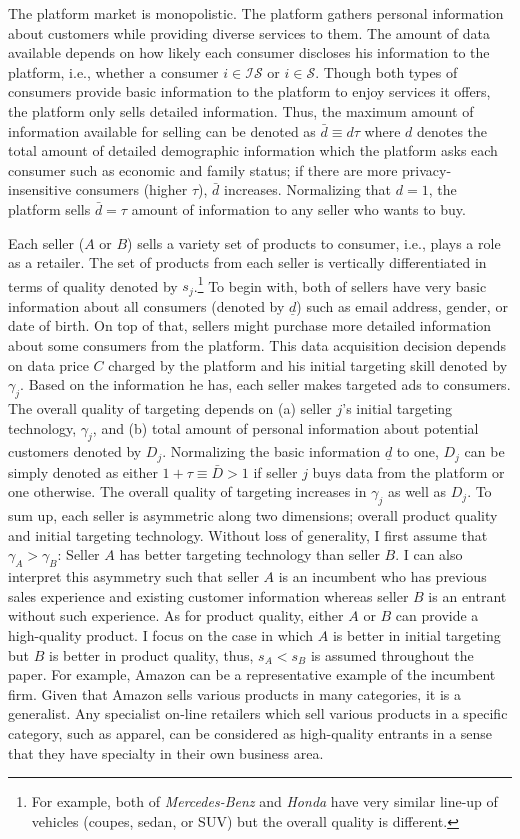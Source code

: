\documentclass[12pt]{article}
\begin{document}
The platform market is monopolistic. The platform gathers personal information about customers while providing diverse services to them. The amount of data available depends on how likely each consumer discloses his information to the platform, i.e., whether a consumer $i \in \mathcal{IS}$ or $i \in \mathcal{S}$. Though both types of consumers provide basic information to the platform to enjoy services it offers, the platform only sells detailed information. Thus, the maximum amount of information available for selling can be denoted as $\bar{d}\equiv d\tau$ where $d$ denotes the total amount of detailed demographic information which the platform asks each consumer such as economic and family status; if there are more privacy-insensitive consumers (higher $\tau$), $\bar{d}$ increases. Normalizing that $d=1$, the platform sells $\bar{d}=\tau$ amount of information to any seller who wants to buy. 

Each seller ($A$ or $B$) sells a variety set of products to consumer, i.e., plays a role as a retailer. The set of products from each seller is vertically differentiated in terms of quality denoted by $s_j$.\footnote{For example, both of \textit{Mercedes-Benz} and \textit{Honda} have very similar line-up of vehicles (coupes, sedan, or SUV) but the overall quality is different.} To begin with, both of sellers have very basic information about all consumers (denoted by $\underline{d}$) such as email address, gender, or date of birth. On top of that, sellers might purchase more detailed information about some consumers from the platform. This data acquisition decision depends on data price $C$ charged by the platform and his initial targeting skill denoted by $\gamma_j$. Based on the information he has, each seller makes targeted ads to consumers. The overall quality of targeting depends on (a) seller $j$'s initial targeting technology, $\gamma_j$, and (b) total amount of personal information about potential customers denoted by $D_j$. Normalizing the basic information $\underline{d}$ to one, $D_j$ can be simply denoted as either $1+ \tau \equiv \bar{D}>1$ if seller $j$ buys data from the platform or one otherwise. The overall quality of targeting increases in $\gamma_j$ as well as $D_j$. To sum up, each seller is asymmetric along two dimensions; overall product quality and initial targeting technology. Without loss of generality, I first assume that $\gamma_A >\gamma_B$: Seller $A$ has better targeting technology than seller $B$. I can also interpret this asymmetry such that seller $A$ is an incumbent who has previous sales experience and existing customer information whereas seller $B$ is an entrant without such experience. As for product quality, either $A$ or $B$ can provide a high-quality product. I focus on the case in which $A$ is better in initial targeting but $B$ is better in product quality, thus, $s_A<s_B$ is assumed throughout the paper. For example, Amazon can be a representative example of the incumbent firm. Given that Amazon sells various products in many categories, it is a generalist. Any specialist on-line retailers which sell various products in a specific category, such as apparel, can be considered as high-quality entrants in a sense that they have specialty in their own business area. 
\end{document}
